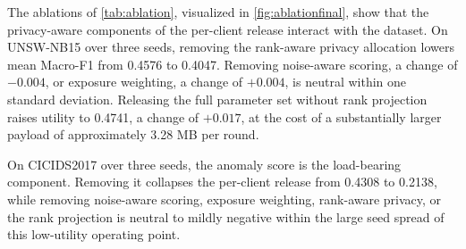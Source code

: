 \documentclass[a4paper,fleqn]{cas-dc}
\begin{document}
\par
\par
The ablations of \cref{tab:ablation}, visualized in
\cref{fig:ablationfinal}, show that the privacy-aware
components of the per-client release interact with the dataset. On UNSW-NB15
over three seeds, removing the rank-aware privacy allocation lowers mean
Macro-F1 from 0.4576 to 0.4047. Removing noise-aware scoring, a change of
$-0.004$, or exposure weighting, a change of $+0.004$, is neutral within one
standard deviation. Releasing the full parameter set without rank projection
raises utility to 0.4741, a change of $+0.017$, at the cost of a
substantially larger payload of approximately 3.28 MB per round.
\par
On CICIDS2017 over three seeds, the anomaly score is the load-bearing
component. Removing it collapses the per-client release from 0.4308 to
0.2138, while removing noise-aware scoring, exposure weighting, rank-aware
privacy, or the rank projection is neutral to mildly negative within the
large seed spread of this low-utility operating point.
\par
\end{document}
